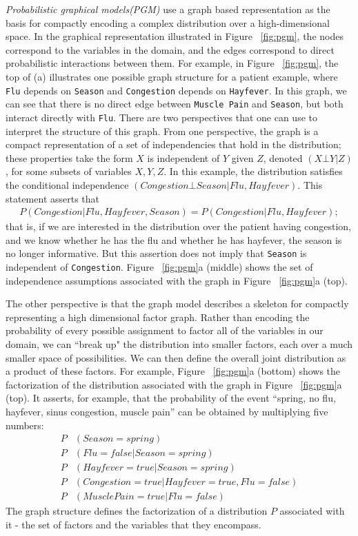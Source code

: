 \textit{Probabilistic graphical models(PGM)} use a graph based representation as the basis for compactly encoding a complex distribution over a high-dimensional space. In the graphical representation illustrated in Figure ~\ref{fig:pgm}, the nodes correspond to the variables in the domain, and the edges correspond to direct probabilistic interactions between them. For example, in Figure ~\ref{fig:pgm}, the top of (a) illustrates one possible graph structure for a patient example, where \texttt{Flu} depends on \texttt{Season} and \texttt{Congestion} depends on \texttt{Hayfever}. In this graph, we can see that there is no direct edge between \texttt{Muscle Pain} and \texttt{Season}, but both interact directly with \texttt{Flu}. There are two perspectives that one can use to interpret the structure of this graph. From one perspective, the graph is a compact representation of a set of independencies that hold in the distribution; these properties take the form $X$ is independent of $Y$ given $Z$, denoted $(X \bot Y | Z)$, for some subsets of variables $X, Y ,Z$. In this example, the distribution satisfies the conditional independence $(Congestion \bot Season | Flu, Hayfever)$. This statement asserts that
\begin{align*}
P(Congestion | Flu, Hayfever, Season) = P(Congestion | Flu, Hayfever);
\end{align*}
that is, if we are interested in the distribution over the patient having congestion, and we know whether he has the flu and whether he has hayfever, the season is no longer informative. But this assertion does not imply that \texttt{Season} is independent of \texttt{Congestion}. Figure ~\ref{fig:pgm}a (middle) shows the set of independence assumptions associated with the graph in Figure ~\ref{fig:pgm}a (top).

The other perspective is that the graph model describes a skeleton for compactly representing a high dimensional factor graph. Rather than encoding the probability of every possible assignment to factor all of the variables in our domain, we can ``break up" the distribution into smaller factors, each over a much smaller space of possibilities. We can then define the overall joint distribution as a product of these factors. For example, Figure ~\ref{fig:pgm}a (bottom) shows the factorization of the distribution associated with the graph in Figure ~\ref{fig:pgm}a (top). It asserts, for example, that the probability of the event “spring, no flu, hayfever, sinus congestion, muscle pain” can be obtained by multiplying five numbers:
\begin{align*}
  P&(Season = spring)\\
  P&(Flu = false | Season = spring)\\
  P&(Hayfever = true | Season = spring)\\
  P&(Congestion = true | Hayfever = true,Flu = false)\\
  P&(Muscle Pain = true | Flu = false)
\end{align*}
The graph structure defines the factorization of a distribution $P$ associated with it - the set of factors and the variables that they encompass.

